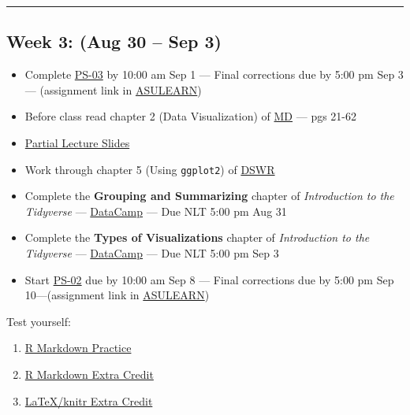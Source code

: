 \documentclass[
]{article}
\providecommand{\tightlist}{%
  \setlength{\itemsep}{0pt}\setlength{\parskip}{0pt}}
\begin{document}
\begin{center}\rule{0.5\linewidth}{0.5pt}\end{center}

\hypertarget{week-3-aug-30-sep-3}{%
\subsection*{Week 3: (Aug 30 -- Sep 3)}\label{week-3-aug-30-sep-3}}

\begin{itemize}
\item
  Complete
  \href{https://classroom.github.com/classrooms/87543903-stt3850-fall2021}{PS-03}
  by 10:00 am Sep 1 --- Final corrections due by 5:00 pm Sep 3 ---
  (assignment link in
  \href{https://asulearn.appstate.edu/course/view.php?id=131169}{ASULEARN})
\item
  Before class read chapter 2 (Data Visualization) of
  \href{https://moderndive.com}{MD} --- pgs 21-62
\item
  \href{../Handouts/short_pre_lecture.pdf}{Partial Lecture Slides}
\item
  Work through chapter 5 (Using \texttt{ggplot2}) of
  \href{https://stat-ata-asu.github.io/R_DS_BD2020/}{DSWR}
\item
  Complete the \textbf{Grouping and Summarizing} chapter of
  \emph{Introduction to the Tidyverse} ---
  \href{https://app.datacamp.com/groups/stt3850-fall2021/assignments}{DataCamp}
  --- Due NLT 5:00 pm Aug 31
\item
  Complete the \textbf{Types of Visualizations} chapter of
  \emph{Introduction to the Tidyverse} ---
  \href{https://app.datacamp.com/groups/stt3850-fall2021/assignments}{DataCamp}
  --- Due NLT 5:00 pm Sep 3
\item
  Start
  \href{https://classroom.github.com/classrooms/87543903-stt3850-fall2021}{PS-02}
  due by 10:00 am Sep 8 --- Final corrections due by 5:00 pm Sep
  10---(assignment link in
  \href{https://asulearn.appstate.edu/course/view.php?id=131169}{ASULEARN})
\end{itemize}

\begin{rmdexercise}
Test yourself:

\begin{enumerate}
\def\arabic{enumi}.{\arabic{enumi}.}
\tightlist
\item
  \href{RMarkdown.pdf}{R Markdown Practice}
\item
  \href{RMarkdownEC.pdf}{R Markdown Extra Credit}
\item
  \href{knitrEC.pdf}{LaTeX/knitr Extra Credit}
\end{enumerate}
\end{rmdexercise}
\end{document}
